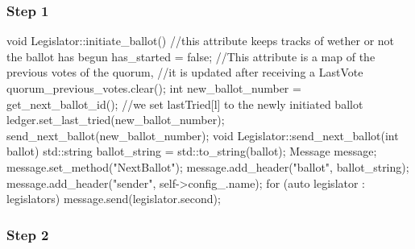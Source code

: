 \documentclass{article}
\begin{document}
\subsubsection{Step 1}
\begin{code}
void Legislator::initiate_ballot()
{
    //this attribute keeps tracks of wether or not the ballot has begun
    has_started = false;
    //This attribute is a map of the previous votes of the quorum,
    //it is updated after receiving a LastVote
    quorum_previous_votes.clear();
    int new_ballot_number = get_next_ballot_id();
    //we set lastTried[l] to the newly initiated ballot
    ledger.set_last_tried(new_ballot_number);
    send_next_ballot(new_ballot_number);
}
void Legislator::send_next_ballot(int ballot)
{
    std::string ballot_string = std::to_string(ballot);
    Message message;
    message.set_method("NextBallot");
    message.add_header("ballot", ballot_string);
    message.add_header("sender", self->config_.name);
    for (auto legislator : legislators)
        message.send(legislator.second);
}
\end{code}

\subsubsection{Step 2}
\end{document}
